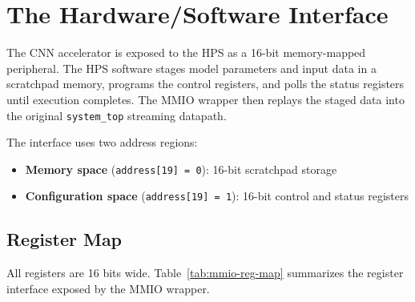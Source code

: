 \section{The Hardware/Software Interface}

The CNN accelerator is exposed to the HPS as a 16-bit memory-mapped peripheral.
The HPS software stages model parameters and input data in a scratchpad memory,
programs the control registers, and polls the status registers until execution
completes. The MMIO wrapper then replays the staged data into the original
\texttt{system\_top} streaming datapath.

The interface uses two address regions:
\begin{itemize}
\item \textbf{Memory space} (\texttt{address[19] = 0}): 16-bit scratchpad storage
\item \textbf{Configuration space} (\texttt{address[19] = 1}): 16-bit control and status registers
\end{itemize}

\subsection{Register Map}

All registers are 16 bits wide. Table~\ref{tab:mmio-reg-map} summarizes the
register interface exposed by the MMIO wrapper.

